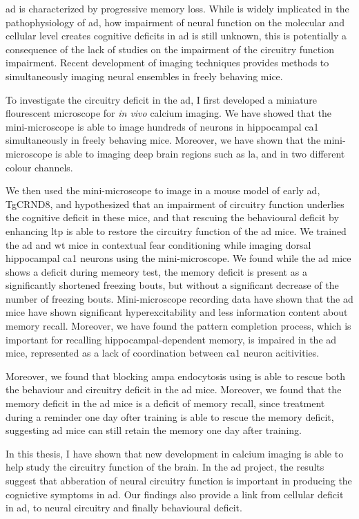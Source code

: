 \Gls{ad} is characterized by progressive memory loss. While \abeta is widely implicated in the pathophysiology of \gls{ad}, how impairment of neural function on the molecular and cellular level creates cognitive deficits in \gls{ad} is still unknown, this is potentially a consequence of the lack of studies on the impairment of the circuitry function impairment. Recent development of imaging techniques provides methods to simultaneously imaging neural ensembles in freely behaving mice. 

To investigate the circuitry deficit in the \gls{ad}, I first developed a miniature flourescent microscope for \textit{in vivo} calcium imaging. We have showed that the mini-microscope is able to image hundreds of neurons in hippocampal \gls{ca1} simultaneously in freely behaving mice. Moreover, we have shown that the mini-microscope is able to imaging deep brain regions such as \gls{la}, and in two different colour channels. 

We then used the mini-microscope to image in a mouse model of early \gls{ad}, TgCRND8, and hypothesized that an impairment of circuitry function underlies the cognitive deficit in these mice, and that rescuing the behavioural deficit by enhancing \gls{ltp} is able to restore the circuitry function of the \gls{ad} mice. We trained the \gls{ad} and \gls{wt} mice in contextual fear conditioning while imaging dorsal hippocampal \gls{ca1} neurons using the mini-microscope. We found while the \gls{ad} mice shows a deficit during memeory test, the memory deficit is present as a significantly shortened freezing bouts, but without a significant decrease of the number of freezing bouts. Mini-microscope recording data have shown that the \gls{ad} mice have shown significant hyperexcitability and less information content about memory recall. Moreover, we have found the pattern completion process, which is important for recalling hippocampal-dependent memory, is impaired in the \gls{ad} mice, represented as a lack of coordination between \gls{ca1} neuron acitivities. 

Moreover, we found that blocking \gls{ampa} endocytosis using \tglu is able to rescue both the behaviour and circuitry deficit in the \gls{ad} mice. Moreover, we found that the memory deficit in the \gls{ad} mice is a deficit of memory recall, since \tglu treatment during a reminder one day ofter training is able to rescue the memory deficit, suggesting \gls{ad} mice can still retain the memory one day after training. 

In this thesis, I have shown that new development in calcium imaging is able to help study the circuitry function of the brain. In the \gls{ad} project, the results suggest that abberation of neural circuitry function is important in producing the cognictive symptoms in \gls{ad}. Our findings also provide a link from cellular deficit in \gls{ad}, to neural circuitry and finally behavioural deficit. 


